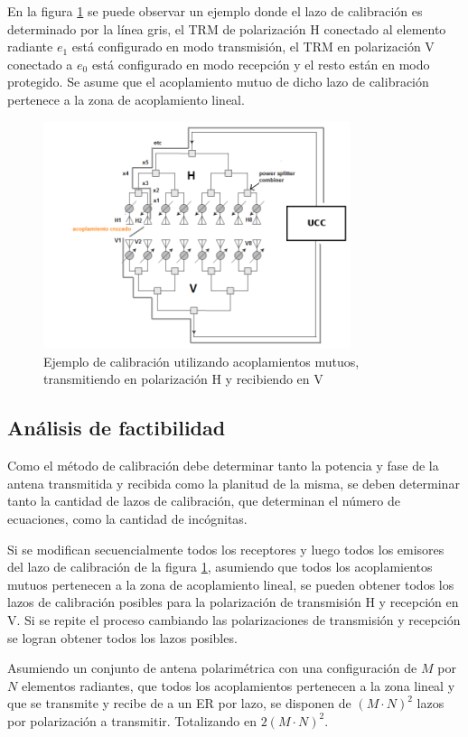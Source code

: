 En la figura \ref{fig:mutual_general} se puede observar un ejemplo donde el lazo de calibración es determinado por la línea
gris, el TRM de polarización H conectado al elemento radiante $e_1$ está configurado en modo transmisión, el TRM en
polarización V conectado a $e_0$ está configurado en modo recepción y el resto están en modo protegido. Se asume que el
acoplamiento mutuo de dicho lazo de calibración pertenece a la zona de acoplamiento lineal.
\begin{figure}[H]
 \centering
 \includegraphics[width=9cm]{gfx/mutualCouplingExample.png}
 \caption{Ejemplo de calibración utilizando acoplamientos mutuos, transmitiendo en polarización H y recibiendo en V}
 \label{fig:mutual_general}
\end{figure}


\subsection{Análisis de factibilidad} \label{ssc:feasibility}

Como el método de calibración debe determinar tanto la potencia y fase de la antena transmitida y recibida como la planitud de
la misma, se deben determinar tanto la cantidad de lazos de calibración, que determinan el número de ecuaciones, como la
cantidad de incógnitas.

Si se modifican secuencialmente todos los receptores y luego todos los emisores del lazo de calibración de la figura
\ref{fig:mutual_general}, asumiendo que todos los acoplamientos mutuos pertenecen a la zona de acoplamiento lineal, se pueden obtener 
todos los lazos de calibración posibles para la polarización de transmisión H y recepción en V. Si se repite el proceso
cambiando las polarizaciones de transmisión y recepción se logran obtener todos los lazos posibles.

Asumiendo un conjunto de antena polarimétrica con una configuración de $M$ por $N$ elementos radiantes, que todos los
acoplamientos pertenecen a la zona lineal y que se transmite y recibe de a un ER por lazo, se disponen de $(M\cdot N)^2$ lazos
por polarización a transmitir. Totalizando en $2(M\cdot N)^2$.

